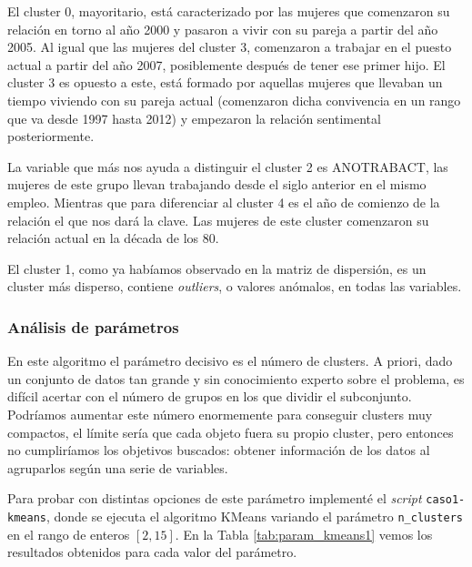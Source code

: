 \documentclass[a4paper, 20pt]{article}
\begin{document}
El cluster 0, mayoritario, está caracterizado por las mujeres que comenzaron su relación en torno al año 2000 y pasaron a vivir con su pareja a partir del año 2005. Al igual que las mujeres del cluster 3, comenzaron a trabajar en el puesto actual a partir del año 2007, posiblemente después de tener ese primer hijo. El cluster 3 es opuesto a este, está formado por aquellas mujeres que llevaban un tiempo viviendo con su pareja actual (comenzaron dicha convivencia en un rango que va desde 1997 hasta 2012) y empezaron la relación sentimental posteriormente.

La variable que más nos ayuda a distinguir el cluster 2 es ANOTRABACT, las mujeres de este grupo llevan trabajando desde el siglo anterior en el mismo empleo. Mientras que para diferenciar al cluster 4 es el año de comienzo de la relación el que nos dará la clave. Las mujeres de este cluster comenzaron su relación actual en la década de los 80.

El cluster 1, como ya habíamos observado en la matriz de dispersión, es un cluster más disperso, contiene \textit{outliers}, o valores anómalos, en todas las variables.

\subsubsection{Análisis de parámetros}

En este algoritmo el parámetro decisivo es el número de clusters. A priori, dado un conjunto de datos tan grande y sin conocimiento experto sobre el problema, es difícil acertar con el número de grupos en los que dividir el subconjunto. Podríamos aumentar este número enormemente para conseguir clusters muy compactos, el límite sería que cada objeto fuera su propio cluster, pero entonces no cumpliríamos los objetivos buscados: obtener información de los datos al agruparlos según una serie de variables.

Para probar con distintas opciones de este parámetro implementé el \textit{script} \texttt{caso1-kmeans}, donde se ejecuta el algoritmo KMeans variando el parámetro \texttt{n\_clusters} en el rango de enteros $[2,15]$. En la Tabla \ref{tab:param_kmeans1} vemos los resultados obtenidos para cada valor del parámetro.
\end{document}
